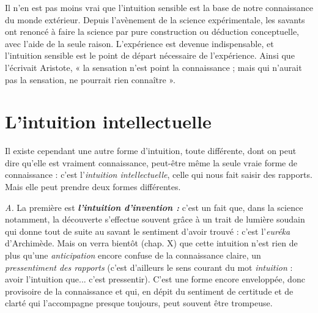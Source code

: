 Il n’en est pas moins vrai que l'intuition sensible est la base de
notre connaissance du monde extérieur. Depuis l’avènement de la
science expérimentale, les savants ont renoncé à faire la science par
pure construction ou déduction conceptuelle, avec l’aide de la seule
raison. L’expérience est devenue indispensable, et l'intuition sensible
est le point de départ nécessaire de l'expérience. Ainsi que l’écrivait
Aristote, « la sensation n’est point la connaissance ; mais qui
n’aurait pas la sensation, ne pourrait rien connaître ».

\section{L’intuition intellectuelle}%
Il existe cependant une autre
forme d’intuition, toute différente, dont on peut dire qu’elle est vraiment
connaissance, peut-être même la seule vraie forme de connaissance :
c’est l’{\it intuition intellectuelle}, celle qui nous fait saisir des rapports.
Mais elle peut prendre deux formes différentes.

{\it A.} La première est \textbf{\textit {l'intuition d'invention :}} c’est un fait que, dans
la science notamment, la découverte s'effectue souvent grâce à un
trait de lumière soudain qui donne tout de suite au savant le sentiment
d’avoir trouvé : c’est l’{\it euréka} d’Archimède. Mais on verra
bientôt (chap. X) que cette intuition n’est rien de plus qu’une {\it anticipation}
encore confuse de la connaissance claire, un {\it pressentiment des
rapports} (c’est d’ailleurs le sens courant du mot {\it intuition} : avoir
l'intuition que... c’est pressentir). C’est une forme encore enveloppée,
donc provisoire de la connaissance et qui, en dépit du sentiment de
certitude et de clarté qui l'accompagne presque toujours, peut souvent
être trompeuse.

